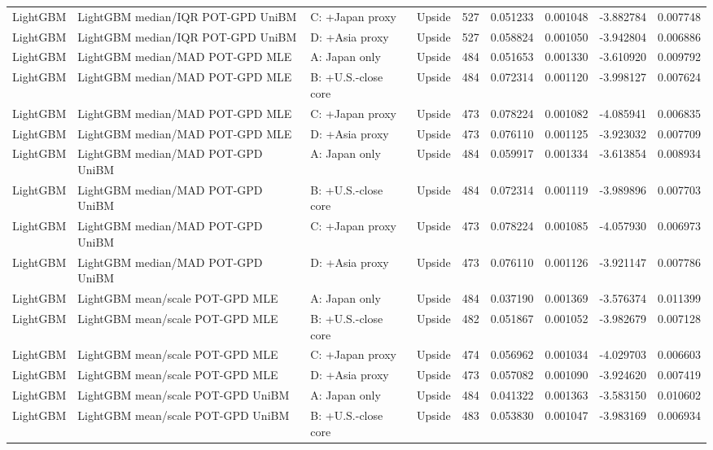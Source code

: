 \begin{tabular}{lll lrrrrr}
LightGBM & LightGBM median/IQR POT-GPD UniBM & C: +Japan proxy & Upside & 527 & 0.051233 & 0.001048 & -3.882784 & 0.007748 \\
LightGBM & LightGBM median/IQR POT-GPD UniBM & D: +Asia proxy & Upside & 527 & 0.058824 & 0.001050 & -3.942804 & 0.006886 \\
LightGBM & LightGBM median/MAD POT-GPD MLE & A: Japan only & Upside & 484 & 0.051653 & 0.001330 & -3.610920 & 0.009792 \\
LightGBM & LightGBM median/MAD POT-GPD MLE & B: +U.S.-close core & Upside & 484 & 0.072314 & 0.001120 & -3.998127 & 0.007624 \\
LightGBM & LightGBM median/MAD POT-GPD MLE & C: +Japan proxy & Upside & 473 & 0.078224 & 0.001082 & -4.085941 & 0.006835 \\
LightGBM & LightGBM median/MAD POT-GPD MLE & D: +Asia proxy & Upside & 473 & 0.076110 & 0.001125 & -3.923032 & 0.007709 \\
LightGBM & LightGBM median/MAD POT-GPD UniBM & A: Japan only & Upside & 484 & 0.059917 & 0.001334 & -3.613854 & 0.008934 \\
LightGBM & LightGBM median/MAD POT-GPD UniBM & B: +U.S.-close core & Upside & 484 & 0.072314 & 0.001119 & -3.989896 & 0.007703 \\
LightGBM & LightGBM median/MAD POT-GPD UniBM & C: +Japan proxy & Upside & 473 & 0.078224 & 0.001085 & -4.057930 & 0.006973 \\
LightGBM & LightGBM median/MAD POT-GPD UniBM & D: +Asia proxy & Upside & 473 & 0.076110 & 0.001126 & -3.921147 & 0.007786 \\
LightGBM & LightGBM mean/scale POT-GPD MLE & A: Japan only & Upside & 484 & 0.037190 & 0.001369 & -3.576374 & 0.011399 \\
LightGBM & LightGBM mean/scale POT-GPD MLE & B: +U.S.-close core & Upside & 482 & 0.051867 & 0.001052 & -3.982679 & 0.007128 \\
LightGBM & LightGBM mean/scale POT-GPD MLE & C: +Japan proxy & Upside & 474 & 0.056962 & 0.001034 & -4.029703 & 0.006603 \\
LightGBM & LightGBM mean/scale POT-GPD MLE & D: +Asia proxy & Upside & 473 & 0.057082 & 0.001090 & -3.924620 & 0.007419 \\
LightGBM & LightGBM mean/scale POT-GPD UniBM & A: Japan only & Upside & 484 & 0.041322 & 0.001363 & -3.583150 & 0.010602 \\
LightGBM & LightGBM mean/scale POT-GPD UniBM & B: +U.S.-close core & Upside & 483 & 0.053830 & 0.001047 & -3.983169 & 0.006934 \\

\end{tabular}
